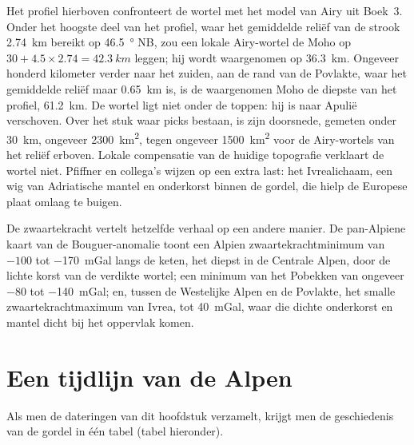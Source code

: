 Het profiel hierboven confronteert de wortel met het model van Airy uit
Boek~3. Onder het hoogste deel van het profiel, waar het gemiddelde reliëf van de strook
\qty{2.74}{km} bereikt op \qty{46.5}{\degree} NB, zou een lokale Airy-wortel de Moho op
$30 + 4.5 \times 2.74 = \qty{42.3}{km}$ leggen; hij wordt waargenomen op \qty{36.3}{km}. Ongeveer honderd
kilometer verder naar het zuiden, aan de rand van de Povlakte, waar het gemiddelde reliëf maar
\qty{0.65}{km} is, is de waargenomen Moho de diepste van het profiel, \qty{61.2}{km}. De wortel ligt niet onder de toppen: hij is
naar Apulië verschoven. Over het stuk waar picks bestaan, is zijn doorsnede, gemeten
onder \qty{30}{km}, ongeveer \qty{2300}{km^2}, tegen ongeveer \qty{1500}{km^2} voor de
Airy-wortels van het reliëf erboven. Lokale compensatie van de huidige topografie verklaart de
wortel niet. Pfiffner en collega's wijzen op een extra last: het Ivrealichaam, een wig van
Adriatische mantel en onderkorst binnen de gordel, die hielp de Europese plaat
omlaag te buigen.

De zwaartekracht vertelt hetzelfde verhaal op een andere manier. De pan-Alpiene kaart van de Bouguer-anomalie toont een
Alpien zwaartekrachtminimum van $-100$ tot \qty{-170}{mGal} langs de keten, het diepst in de Centrale
Alpen, door de lichte korst van de verdikte wortel; een minimum van het Pobekken van ongeveer $-80$ tot
\qty{-140}{mGal}; en, tussen de Westelijke Alpen en de Povlakte, het smalle zwaartekrachtmaximum van Ivrea,
tot \qty{+40}{mGal}, waar die dichte onderkorst en mantel dicht bij het
oppervlak komen.

\section{Een tijdlijn van de Alpen}\label{sec:b2:alpine-orogen:timeline}

Als men de dateringen van dit hoofdstuk verzamelt, krijgt men de geschiedenis van de gordel in één tabel
(tabel hieronder).

